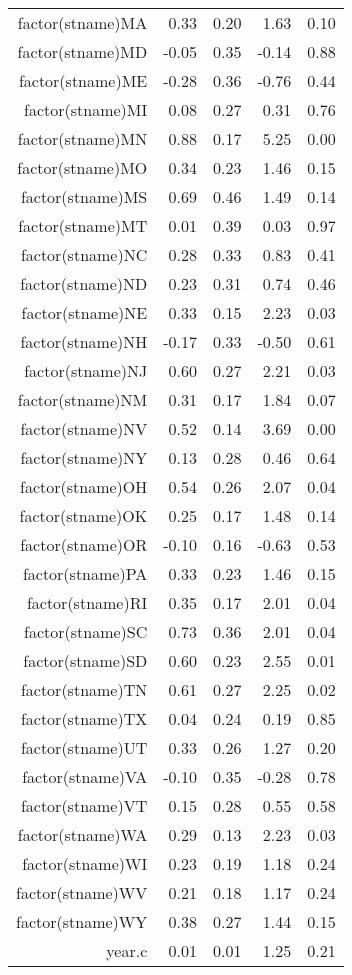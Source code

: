 \begin{table}[ht]
\begin{tabular}{rrrrr}
  factor(stname)MA & 0.33 & 0.20 & 1.63 & 0.10 \\ 
  factor(stname)MD & -0.05 & 0.35 & -0.14 & 0.88 \\ 
  factor(stname)ME & -0.28 & 0.36 & -0.76 & 0.44 \\ 
  factor(stname)MI & 0.08 & 0.27 & 0.31 & 0.76 \\ 
  factor(stname)MN & 0.88 & 0.17 & 5.25 & 0.00 \\ 
  factor(stname)MO & 0.34 & 0.23 & 1.46 & 0.15 \\ 
  factor(stname)MS & 0.69 & 0.46 & 1.49 & 0.14 \\ 
  factor(stname)MT & 0.01 & 0.39 & 0.03 & 0.97 \\ 
  factor(stname)NC & 0.28 & 0.33 & 0.83 & 0.41 \\ 
  factor(stname)ND & 0.23 & 0.31 & 0.74 & 0.46 \\ 
  factor(stname)NE & 0.33 & 0.15 & 2.23 & 0.03 \\ 
  factor(stname)NH & -0.17 & 0.33 & -0.50 & 0.61 \\ 
  factor(stname)NJ & 0.60 & 0.27 & 2.21 & 0.03 \\ 
  factor(stname)NM & 0.31 & 0.17 & 1.84 & 0.07 \\ 
  factor(stname)NV & 0.52 & 0.14 & 3.69 & 0.00 \\ 
  factor(stname)NY & 0.13 & 0.28 & 0.46 & 0.64 \\ 
  factor(stname)OH & 0.54 & 0.26 & 2.07 & 0.04 \\ 
  factor(stname)OK & 0.25 & 0.17 & 1.48 & 0.14 \\ 
  factor(stname)OR & -0.10 & 0.16 & -0.63 & 0.53 \\ 
  factor(stname)PA & 0.33 & 0.23 & 1.46 & 0.15 \\ 
  factor(stname)RI & 0.35 & 0.17 & 2.01 & 0.04 \\ 
  factor(stname)SC & 0.73 & 0.36 & 2.01 & 0.04 \\ 
  factor(stname)SD & 0.60 & 0.23 & 2.55 & 0.01 \\ 
  factor(stname)TN & 0.61 & 0.27 & 2.25 & 0.02 \\ 
  factor(stname)TX & 0.04 & 0.24 & 0.19 & 0.85 \\ 
  factor(stname)UT & 0.33 & 0.26 & 1.27 & 0.20 \\ 
  factor(stname)VA & -0.10 & 0.35 & -0.28 & 0.78 \\ 
  factor(stname)VT & 0.15 & 0.28 & 0.55 & 0.58 \\ 
  factor(stname)WA & 0.29 & 0.13 & 2.23 & 0.03 \\ 
  factor(stname)WI & 0.23 & 0.19 & 1.18 & 0.24 \\ 
  factor(stname)WV & 0.21 & 0.18 & 1.17 & 0.24 \\ 
  factor(stname)WY & 0.38 & 0.27 & 1.44 & 0.15 \\ 
  year.c & 0.01 & 0.01 & 1.25 & 0.21 \\ 
   \hline
\end{tabular}
\end{table}
